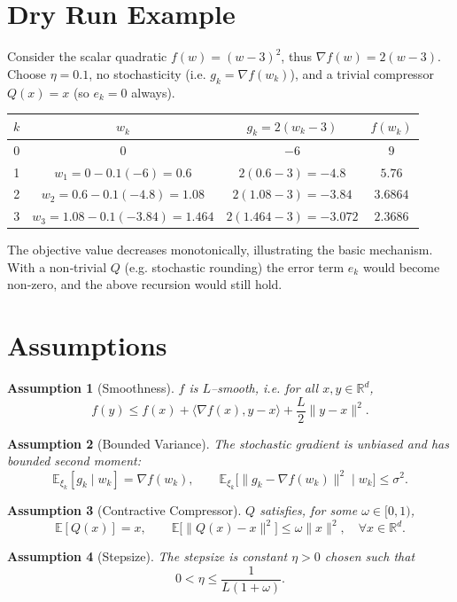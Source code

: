 \documentclass{article}
\newtheorem{assumption}{Assumption}
\newcommand{\E}{\mathbb{E}}
\newcommand{\R}{\mathbb{R}}
\begin{document}
\section*{Dry Run Example}
Consider the scalar quadratic $f(w)=(w-3)^{2}$, thus $\nabla f(w)=2(w-3)$.  
Choose $\eta=0.1$, no stochasticity (i.e. $g_{k}=\nabla f(w_{k})$), and a trivial compressor $Q(x)=x$ (so $e_{k}=0$ always).  

\begin{center}
\begin{tabular}{c|c|c|c}
$k$ & $w_{k}$ & $g_{k}=2(w_{k}-3)$ & $f(w_{k})$\\ \hline
0 & $0$ & $-6$ & $9$\\
1 & $w_{1}=0-0.1(-6)=0.6$ & $2(0.6-3)=-4.8$ & $5.76$\\
2 & $w_{2}=0.6-0.1(-4.8)=1.08$ & $2(1.08-3)=-3.84$ & $3.6864$\\
3 & $w_{3}=1.08-0.1(-3.84)=1.464$ & $2(1.464-3)=-3.072$ & $2.3686$\\
\end{tabular}
\end{center}
The objective value decreases monotonically, illustrating the basic mechanism.  With a non‑trivial $Q$ (e.g. stochastic rounding) the error term $e_{k}$ would become non‑zero, and the above recursion would still hold.

\newpage

\section*{Assumptions}
\begin{assumption}[Smoothness]\label{ass:smooth}
$f$ is $L$–smooth, i.e. for all $x,y\in\R^{d}$,
\[
f(y)\le f(x)+\langle\nabla f(x),y-x\rangle+\frac{L}{2}\|y-x\|^{2}.
\]
\end{assumption}
\begin{assumption}[Bounded Variance]\label{ass:variance}
The stochastic gradient is unbiased and has bounded second moment:
\[
\E_{\xi_{k}}[g_{k}\mid w_{k}]=\nabla f(w_{k}),\qquad 
\E_{\xi_{k}}\big[\|g_{k}-\nabla f(w_{k})\|^{2}\mid w_{k}\big]\le\sigma^{2}.
\]
\end{assumption}
\begin{assumption}[Contractive Compressor]\label{ass:compressor}
$Q$ satisfies, for some $\omega\in[0,1)$,
\[
\E[Q(x)]=x,\qquad 
\E\big[\|Q(x)-x\|^{2}\big]\le\omega\|x\|^{2},\quad\forall x\in\R^{d}.
\]
\end{assumption}
\begin{assumption}[Stepsize]\label{ass:stepsize}
The stepsize is constant $\eta>0$ chosen such that
\[
0<\eta\le\frac{1}{L(1+\omega)}.
\]
\end{assumption}
\end{document}
